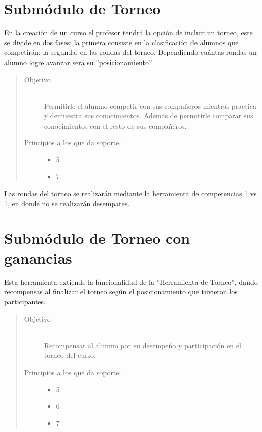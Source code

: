 \clearpage
    
\section{Submódulo de Torneo}

    En la creación de un curso el profesor tendrá la opción de incluir un torneo, este se divide en dos fases; la primera consiste en la clasificación de alumnos que competirán; la segunda, en las rondas del torneo. Dependiendo cuántas rondas un alumno logre avanzar será su ''posicionamiento''. 
    
    \begin{quote}
    \begin{description}
    \item[Objetivo] \hfill\\
        Permitirle el alumno competir con sus compañeros mientras practica y demuestra sus conocimientos. Además de permitirle comparar sus conocimientos con el resto de sus compañeros.
    
    \item[Principios a los que da soporte:] \hfill
        \begin{itemize}
            \item 5 \principioV
            \item 7 \principioVII 
        \end{itemize}
    \end{description}
    \end{quote}
    
    \noindent Las rondas del torneo se realizarán mediante la herramienta de competencias 1 vs 1, en donde no se realizarán desempates.
    
\section{Submódulo de Torneo con ganancias}

    Esta herramienta extiende la funcionalidad de la ''Herramienta de Torneo'', dando recompensas al finalizar el torneo según el posicionamiento que tuvieron los participantes.
    
    \begin{quote}
    \begin{description}
    \item[Objetivo] \hfill\\
        Recompensar al alumno por su desempeño y participación en el torneo del curso. 
    \item[Principios a los que da soporte:] \hfill
        \begin{itemize}
            \item 5 \principioV
            \item 6 \principioVI
            \item 7 \principioVII 
        \end{itemize}
    \end{description}
    \end{quote}
    
